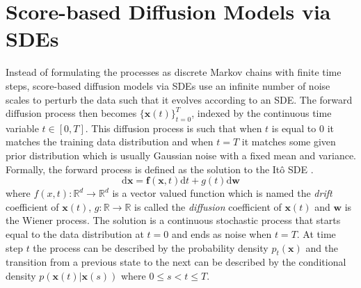 \section{Score-based Diffusion Models via SDEs}
Instead of formulating the processes as discrete Markov chains with finite time steps, score-based diffusion models via SDEs use an infinite number of noise scales to perturb the data such that it evolves according to an SDE. The forward diffusion process then becomes $\{\mathbf{x}(t)\}_{t=0}^T$, indexed by the continuous time variable $t \in [0, T]$. This diffusion process is such that when $t$ is equal to $0$ it matches the training data distribution and when $t=T$ it matches some given prior distribution which is usually Gaussian noise with a fixed mean and variance. Formally, the forward process is defined as the solution to the Itô SDE \cite{oksendal2010stochastic}.
\begin{equation}
	\text{d}\mathbf{x} = \mathbf{f}(\mathbf{x}, t)\text{d}t + g(t)\text{d}\mathbf{w}
\end{equation}
where $f(x,t) : \mathbb{R}^d \to \mathbb{R}^d$ is a vector valued function which is named the \textit{drift} coefficient of $\mathbf{x}(t)$, $g : \mathbb{R} \to \mathbb{R}$ is called the \textit{diffusion} coefficient of $\mathbf{x}(t)$ and $\mathbf{w}$ is the Wiener process. The solution is a continuous stochastic process that starts equal to the data distribution at $t = 0$ and ends as noise when $t = T$. At time step $t$ the process can be described by the probability density $p_t(\mathbf{x})$ and the transition from a previous state to the next can be described by the conditional density $p(\mathbf{x}(t) | \mathbf{x}(s))$ where $0 \leq s < t \leq T$.

